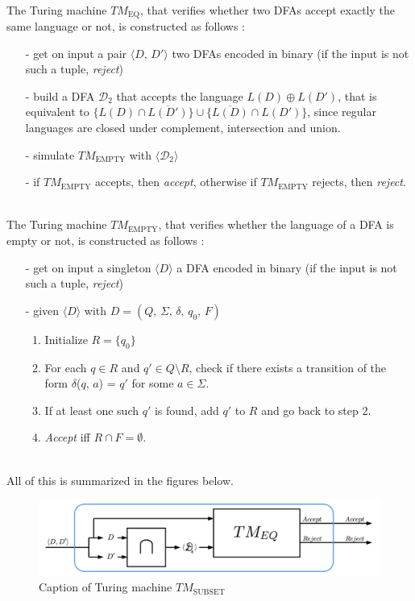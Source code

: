 \documentclass{article}
\begin{document}
\noindent \\ The Turing machine $TM_{\text{EQ}}$, that verifies whether two DFAs accept exactly the same language or not, is constructed as follows : 
\begin{itemize}
    \item [-] get on input a pair $\langle D,\, D'\rangle$ two DFAs encoded in binary (if the input is not such a tuple, \textit{reject})
    \item [-] build a DFA $\mathcal{D}_2$ that accepts the language $L(D)\oplus L(D')$, that is equivalent to $\{L(D)\cap \overline{L(D')}\}\cup\{\overline{L(D)}\cap L(D')\}$, since regular languages are closed under complement, intersection and union.
    \item [-] simulate $TM_{\text{EMPTY}}$ with $\langle\mathcal{D}_2\rangle$
    \item [-] if $TM_{\text{EMPTY}}$ accepts, then \textit{accept}, otherwise if $TM_{\text{EMPTY}}$ rejects, then \textit{reject}.
\end{itemize}

\noindent \\ The Turing machine $TM_{\text{EMPTY}}$, that verifies whether the language of a DFA is empty or not, is constructed as follows : 
\begin{itemize}
    \item [-] get on input a singleton $\langle D\rangle$ a DFA encoded in binary (if the input is not such a tuple, \textit{reject})
    \item [-] given $\langle D\rangle$ with $D = (Q,\, \Sigma,\, \delta,\, q_0,\, F)$ 
    \begin{enumerate}
        \item Initialize $R = \{q_0\}$
        \item For each $q\in R$ and $q'\in Q\setminus R$, check if there exists a transition of the form $\delta$($q$, $a$) = $q'$ for some $a\in\Sigma$.
        \item If at least one such $q'$ is found, add $q'$ to $R$ and go back to step 2.
        \item \textit{Accept} iff $R\cap F=\emptyset$.
    \end{enumerate}
\end{itemize}

\noindent \\ All of this is summarized in the figures below.

\begin{figure}[ht] %
\centering
\includegraphics[scale=0.145]{images/tm subset.jpeg}
\caption{Caption of Turing machine $TM_{\text{SUBSET}}$}
\label{fig:my_label1}
\end{figure}
\end{document}
